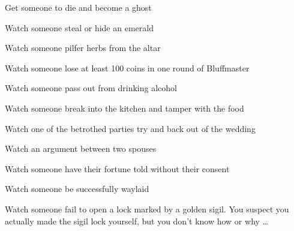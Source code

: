 \documentclass[char]{Kos}
\begin{document}
\begin{itemz}[Goals]
 \item Get someone to die and become a ghost
 \item Watch someone steal or hide an emerald
 \item Watch someone pilfer herbs from the altar
 \item Watch someone lose at least 100 coins in one round of Bluffmaster
 \item Watch someone pass out from drinking alcohol
 \item Watch someone break into the kitchen and tamper with the food
 \item Watch one of the betrothed parties try and back out of the wedding
 \item Watch an argument between two spouses
 \item Watch someone have their fortune told without their consent
  \item Watch someone be successfully waylaid
  \item Watch someone fail to open a lock marked by a golden sigil. You suspect you actually made the sigil lock yourself, but you don't know how or why \ldots
\end{itemz}
\end{document}
